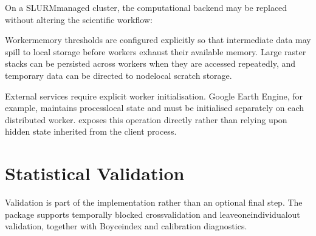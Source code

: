 \documentclass[letterpaper,10pt,english]{sphinxmanual}
\begin{document}
\sphinxAtStartPar
On a SLURM\sphinxhyphen{}managed cluster, the computational backend may be replaced without altering the scientific workflow:

\begin{sphinxVerbatim}[commandchars=\\\{\}]
 
 

  

  
\end{sphinxVerbatim}

\sphinxAtStartPar
Worker\sphinxhyphen{}memory thresholds are configured explicitly so that intermediate data may spill to local storage before workers exhaust their available memory. Large raster stacks can be persisted across workers when they are accessed repeatedly, and temporary data can be directed to node\sphinxhyphen{}local scratch storage.

\sphinxAtStartPar
External services require explicit worker initialisation. Google Earth Engine, for example, maintains process\sphinxhyphen{}local state and must be initialised separately on each distributed worker.  exposes this operation directly rather than relying upon hidden state inherited from the client process.


\section{Statistical Validation}
\label{\detokenize{implementation:statistical-validation}}
\sphinxAtStartPar
Validation is part of the implementation rather than an optional final step. The package supports temporally blocked cross\sphinxhyphen{}validation and leave\sphinxhyphen{}one\sphinxhyphen{}individual\sphinxhyphen{}out validation, together with Boyce\sphinxhyphen{}index and calibration diagnostics.
\end{document}
